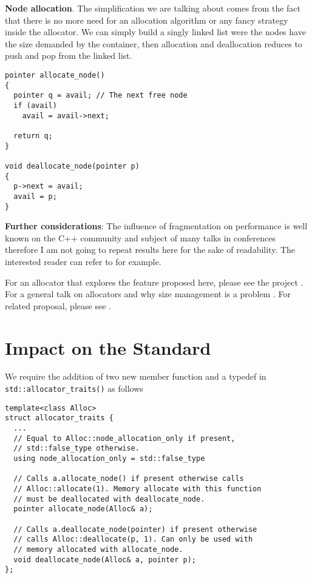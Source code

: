 \documentclass[11pt]{article}
\begin{document}
\noindent
{\bf Node allocation}.  The simplification we are talking about comes from the
fact that there is no more need for an allocation algorithm or any fancy
strategy inside the allocator. We can simply build a singly linked list were
the nodes have the size demanded by the container, then allocation and
deallocation reduces to push and pop from the linked list.

\medskip
\begin{lstlisting}
pointer allocate_node()
{
  pointer q = avail; // The next free node
  if (avail)
    avail = avail->next;

  return q;
}

void deallocate_node(pointer p)
{
  p->next = avail;
  avail = p;
}

\end{lstlisting}

\medskip
\noindent
{\bf Further considerations}: The influence of fragmentation on
performance is well known on the C++ community and subject of many
talks in conferences therefore I am not going to repeat results here
for the sake of readability. The interested reader can refer to
\cite{chandler, meyers} for example.

For an allocator that explores the feature proposed here, please see
the project \cite{rtcpp}. For a general
talk on allocators and why size management is a problem
\cite{alexandrescu}. For related proposal, please see \cite{prop1}.



\section{Impact on the Standard} \label{impact}

We require the addition of two new member function and
a typedef in \texttt{std::allocator\_traits()} as follows

\medskip
\begin{lstlisting}
template<class Alloc>
struct allocator_traits {
  ...
  // Equal to Alloc::node_allocation_only if present,
  // std::false_type otherwise.
  using node_allocation_only = std::false_type

  // Calls a.allocate_node() if present otherwise calls
  // Alloc::allocate(1). Memory allocate with this function
  // must be deallocated with deallocate_node.
  pointer allocate_node(Alloc& a);

  // Calls a.deallocate_node(pointer) if present otherwise
  // calls Alloc::deallocate(p, 1). Can only be used with
  // memory allocated with allocate_node.
  void deallocate_node(Alloc& a, pointer p);
};
\end{lstlisting}
\end{document}
